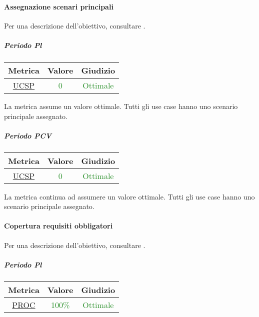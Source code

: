 				\paragraph{Assegnazione scenari principali}
					Per una descrizione dell'obiettivo, consultare .
					\subparagraph{Periodo Pl}
					
					\begin{table}[H]
						\centering
						\begin{tabular}{  c | c | c}
							\hline
							\textbf{Metrica} & \textbf{Valore} & \textbf{Giudizio} \\
							\hline
						\hyperref[MMC]{UCSP}   & \textcolor{ForestGreen}{0}          & \textcolor{ForestGreen}{Ottimale} \\ \hline
						\end{tabular} 
					\end{table}
				
					La metrica assume un valore ottimale. Tutti gli use case hanno uno scenario principale assegnato.
					
					\subparagraph{Periodo PCV}
					
					\begin{table}[H]
						\centering
						\begin{tabular}{  c | c | c}
							\hline
							\textbf{Metrica} & \textbf{Valore} & \textbf{Giudizio} \\
							\hline
							\hyperref[MMC]{UCSP}   & \textcolor{ForestGreen}{0}          & \textcolor{ForestGreen}{Ottimale} \\ \hline
						\end{tabular} 
					\end{table}
					
					La metrica continua ad assumere un valore ottimale. Tutti gli use case hanno uno scenario principale assegnato.
				
				\newpage
				\paragraph{Copertura requisiti obbligatori}
					Per una descrizione dell'obiettivo, consultare .
					\subparagraph{Periodo Pl}
					
					\begin{table}[H]
						\centering
						\begin{tabular}{  c | c | c}
							\hline
							\textbf{Metrica} & \textbf{Valore} & \textbf{Giudizio} \\
							\hline
							\hyperref[MMC]{PROC}   & \textcolor{ForestGreen}{100\%}          & \textcolor{ForestGreen}{Ottimale} \\ \hline
						\end{tabular} 
					\end{table}
				
